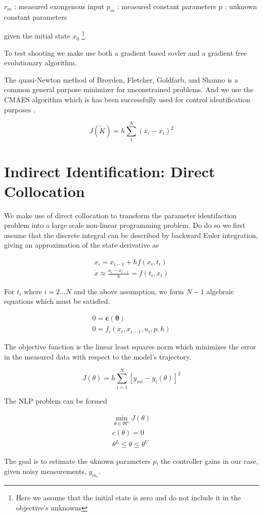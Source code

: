 \documentclass{article}
\begin{document}
$r_m$ : measured exongenous input
$p_m$ : measured constant parameters
p : unknown constant parameters

given the initial state $x_0$ \footnote{Here we assume that the initial state is
zero and do not include it in the objective's unknowns}.

To test shooting we make use both a gradient based sovler and a gradient free
evolutionary algorithm.

The quasi-Newton method of Broyden, Fletcher, Goldfarb, and Shanno is a common
general purpose minimizer for unconstrained problems. And we use the CMAES
algorithm which is has been successfully used for control identification
purposes \cite{Wang2010}.

\begin{equation}
  J(\tilde{K}) = h \sum_1^N (\bar{x}_i - x_i)^2
\end{equation}

\section{Indirect Identification: Direct Collocation}

We make use of direct collocation to transform the parameter identifaction
problem into a large scale non-linear programming problem. Do do so we first
assume that the discrete integral can be described by backward Euler
integration, giving an approximation of the state derivative as

\begin{align}
  x_{i} = x_{i-1} + h f(x_{i}, t_{i}) \\
  \dot{x} \approx \frac{x_i - x_{i-1}}{h} =  f(t_i, x_i)
\end{align}

For $t_i$ where $i=2 \dots N$ and the above assumption, we form $N-1$ algebraic
equations which must be satisfied.

\begin{align}
  0 = \mathbf{c}(\mathbf{\theta}) \\
  0 = f_i(x_{i}, x_{i-1}, u_i, p, h)
\end{align}

The objective function is the linear least squares norm which minimizes the
error in the measured data with respect to the model's trajectory.

\begin{equation}
  J(\theta) = h \sum_{i=1}^N \left[y_{mi} - y_i(\theta)\right]^2
\end{equation}

The NLP problem can be formed

\begin{align}
  \min_{\theta \in \Re^{n}}  J(\theta) \\
  c(\theta) = 0 \\
  \theta^L \leq \theta \leq \theta^U
\end{align}

The goal is to estimate the uknown parameters $p$, the controller gains in our
case, given noisy measurements, $y_{m_i}$.



\end{document}
